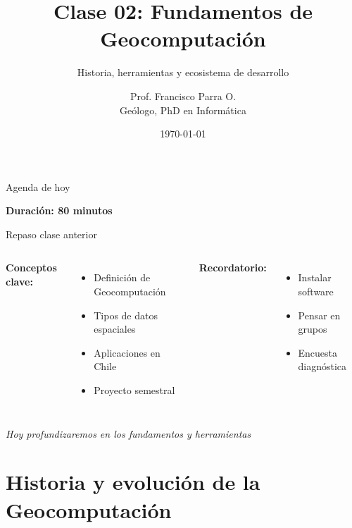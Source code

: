 \documentclass[10pt]{beamer}
\title{Clase 02: Fundamentos de Geocomputación}
\subtitle{Historia, herramientas y ecosistema de desarrollo}
\author{Prof. Francisco Parra O. \\ \small{Geólogo, PhD en Informática}}
\institute{USACH - Ingeniería Civil en Informática}
\date{\today}
\begin{document}
\maketitle

\begin{frame}{Agenda de hoy}
    \tableofcontents
    
    \vspace{0.5cm}
    \begin{center}
        \textcolor{usachblue}{} \textbf{Duración: 80 minutos}
    \end{center}
\end{frame}

\begin{frame}{Repaso clase anterior}
    \begin{columns}
        \textbf{Conceptos clave:}
        \begin{itemize}
            \item Definición de Geocomputación
            \item Tipos de datos espaciales
            \item Aplicaciones en Chile
            \item Proyecto semestral
        \end{itemize}
        
        \textbf{Recordatorio:}
        \begin{itemize}
            \item \textcolor{usachred}{} Instalar software
            \item \textcolor{usachblue}{} Pensar en grupos
            \item \textcolor{green}{} Encuesta diagnóstica
        \end{itemize}
    \end{columns}
    
    \vspace{0.5cm}
    \begin{center}
        \textit{Hoy profundizaremos en los fundamentos y herramientas}
    \end{center}
\end{frame}

\section{Historia y evolución de la Geocomputación}
\end{document}

